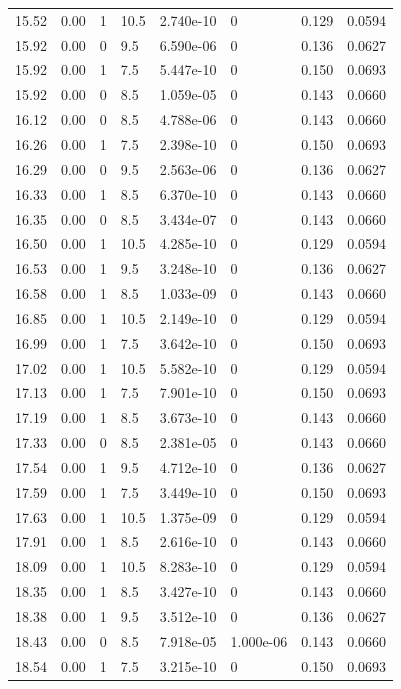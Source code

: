 \documentclass[preview]{standalone}
\begin{document}
{{{\begin{tabular}{L{1.2cm}C{1.2cm} C{0.3cm}C{0.5cm} C{1.4cm}C{1.4cm} C{1.4cm}C{1.4cm}}
  15.52  &  0.00  & 1     & 10.5 &  2.740e-10  & 0  & 0.129 &  0.0594   \\ 
  15.92  &  0.00  & 0     & 9.5 &  6.590e-06  & 0  & 0.136 &  0.0627   \\ 
  15.92  &  0.00  & 1     & 7.5 &  5.447e-10  & 0  & 0.150 &  0.0693   \\ 
  15.92  &  0.00  & 0     & 8.5 &  1.059e-05  & 0  & 0.143 &  0.0660   \\ 
  16.12  &  0.00  & 0     & 8.5 &  4.788e-06  & 0  & 0.143 &  0.0660   \\ 
  16.26  &  0.00  & 1     & 7.5 &  2.398e-10  & 0  & 0.150 &  0.0693   \\ 
  16.29  &  0.00  & 0     & 9.5 &  2.563e-06  & 0  & 0.136 &  0.0627   \\ 
  16.33  &  0.00  & 1     & 8.5 &  6.370e-10  & 0  & 0.143 &  0.0660   \\ 
  16.35  &  0.00  & 0     & 8.5 &  3.434e-07  & 0  & 0.143 &  0.0660   \\ 
  16.50  &  0.00  & 1     & 10.5 &  4.285e-10  & 0  & 0.129 &  0.0594   \\ 
  16.53  &  0.00  & 1     & 9.5 &  3.248e-10  & 0  & 0.136 &  0.0627   \\ 
  16.58  &  0.00  & 1     & 8.5 &  1.033e-09  & 0  & 0.143 &  0.0660   \\ 
  16.85  &  0.00  & 1     & 10.5 &  2.149e-10  & 0  & 0.129 &  0.0594   \\ 
  16.99  &  0.00  & 1     & 7.5 &  3.642e-10  & 0  & 0.150 &  0.0693   \\ 
  17.02  &  0.00  & 1     & 10.5 &  5.582e-10  & 0  & 0.129 &  0.0594   \\ 
  17.13  &  0.00  & 1     & 7.5 &  7.901e-10  & 0  & 0.150 &  0.0693   \\ 
  17.19  &  0.00  & 1     & 8.5 &  3.673e-10  & 0  & 0.143 &  0.0660   \\ 
  17.33  &  0.00  & 0     & 8.5 &  2.381e-05  & 0  & 0.143 &  0.0660   \\ 
  17.54  &  0.00  & 1     & 9.5 &  4.712e-10  & 0  & 0.136 &  0.0627   \\ 
  17.59  &  0.00  & 1     & 7.5 &  3.449e-10  & 0  & 0.150 &  0.0693   \\ 
  17.63  &  0.00  & 1     & 10.5 &  1.375e-09  & 0  & 0.129 &  0.0594   \\ 
  17.91  &  0.00  & 1     & 8.5 &  2.616e-10  & 0  & 0.143 &  0.0660   \\ 
  18.09  &  0.00  & 1     & 10.5 &  8.283e-10  & 0  & 0.129 &  0.0594   \\ 
  18.35  &  0.00  & 1     & 8.5 &  3.427e-10  & 0  & 0.143 &  0.0660   \\ 
  18.38  &  0.00  & 1     & 9.5 &  3.512e-10  & 0  & 0.136 &  0.0627   \\ 
  18.43  &  0.00  & 0     & 8.5 &  7.918e-05  & 1.000e-06  & 0.143 &  0.0660   \\ 
  18.54  &  0.00  & 1     & 7.5 &  3.215e-10  & 0  & 0.150 &  0.0693   \\ 
\hline 
\end{tabular} 

}}}
\end{document}
